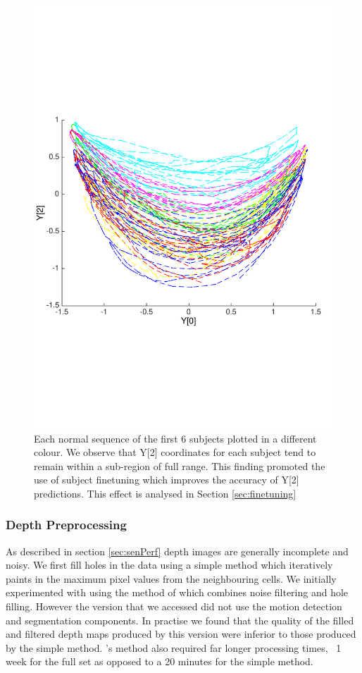 \documentclass[11pt]{article} %
\begin{document}
\begin{figure}
\centering
\includegraphics*[trim={0 5cm 0 7cm},clip,width=0.75\linewidth,clip]{subjectsOnManifold.pdf} 
\caption{Each normal sequence of the first 6 subjects plotted in a different colour. We observe that Y[2] coordinates for each subject tend to remain within a sub-region of full range. This finding promoted the use of subject finetuning which improves the accuracy of Y[2] predictions. This effect is analysed in Section \ref{sec:finetuning} }
\label{fig:subjectsOnManifold}
\end{figure}













\subsubsection{Depth Preprocessing}
\label{sec:depthprec}
As described in section \ref{sec:senPerf} depth images are generally incomplete and noisy. We first fill holes in the data using a simple method which iteratively paints in the maximum pixel values from the neighbouring cells. We initially experimented with using the method of \cite{Camplani2012a} which combines noise filtering and hole filling. However the version that we accessed did not use the motion detection and segmentation components. In practise we found that the quality of the filled and filtered depth maps produced by this version were inferior to those produced by the simple method.  \cite{Camplani2012a}'s method also required far longer processing times, ~1 week for the full set as opposed to a 20 minutes for the simple method. 
\end{document}
